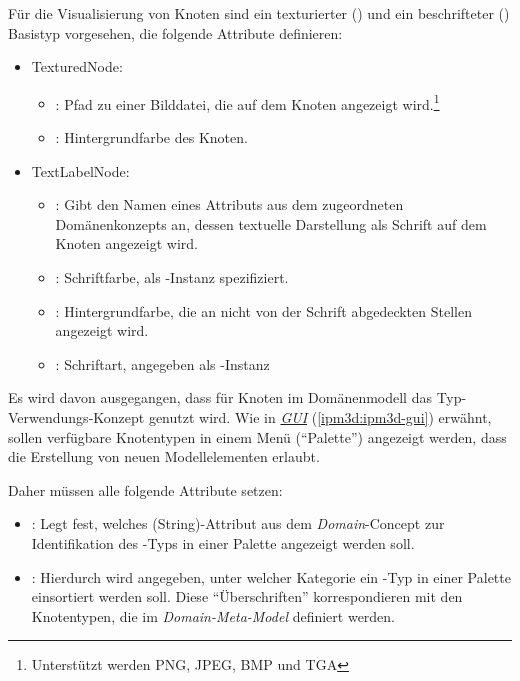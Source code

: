 \documentclass[a4paper,10pt]{sphinxmanual}
\begin{document}
Für die Visualisierung von Knoten sind ein texturierter () und ein beschrifteter () Basistyp vorgesehen, die folgende Attribute definieren:
\begin{itemize}
\item {} 
TexturedNode:
\begin{itemize}
\item {} 
: Pfad zu einer Bilddatei, die auf dem Knoten angezeigt wird.\footnote{
Unterstützt werden PNG, JPEG, BMP und TGA
}

\item {} 
: Hintergrundfarbe des Knoten.

\end{itemize}

\item {} 
TextLabelNode:
\begin{itemize}
\item {} 
: Gibt den Namen eines Attributs aus dem zugeordneten Domänenkonzepts an, dessen textuelle Darstellung als Schrift auf dem Knoten angezeigt wird.

\item {} 
: Schriftfarbe, als -Instanz spezifiziert.

\item {} 
: Hintergrundfarbe, die an nicht von der Schrift abgedeckten Stellen angezeigt wird.

\item {} 
: Schriftart, angegeben als -Instanz

\end{itemize}

\end{itemize}

Es wird davon ausgegangen, dass für Knoten im Domänenmodell das Typ-Verwendungs-Konzept genutzt wird.
Wie in {\hyperref[ipm3d:ipm3d-gui]{\emph{GUI}}} (\autoref*{ipm3d:ipm3d-gui}) erwähnt, sollen verfügbare Knotentypen in einem Menü ("`Palette"') angezeigt werden, dass die Erstellung von neuen Modellelementen erlaubt.

Daher müssen alle  folgende Attribute setzen:
\begin{itemize}
\item {} 
: Legt fest, welches (String)-Attribut aus dem \emph{Domain}-Concept zur Identifikation des -Typs in einer Palette angezeigt werden soll.

\item {} 
: Hierdurch wird angegeben, unter welcher Kategorie ein -Typ in einer Palette einsortiert werden soll.
Diese "`Überschriften"' korrespondieren mit den Knotentypen, die im \emph{Domain-Meta-Model} definiert werden.

\end{itemize}
\end{document}
